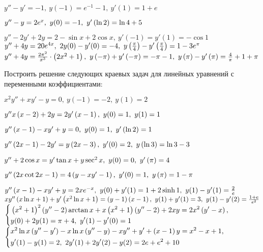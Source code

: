 	\begin{enumtasks}

		\label{bvp_bvp:constcoeffs_nonhmg}
		\item \( y'' - y' = -1, ~ y(-1) = e^{-1} - 1, ~ y'(1) = 1 + e \)		%
		\item \( y'' - y = 2 e^{x}, ~ y(0) = -1, ~ y' \left( \ln{2} \right) = \ln{4} + 5 \)		%
		\item \( y'' - 2 y' + 2 y = 2 - \sin{x} + 2 \cos{x}, ~ y'(-1) = y'(1) = - \cos{1} \)		%
		\itemstar \( y'' + 4 y = 20 e^{4 x}, ~ 2 y(0) - y'(0) = -4, ~ y \left( \frac{\pi}{4} \right) - y' \left( \frac{\pi}{4} \right) = 1 - 3 e^{\pi} \)		%
		\itemstar \( y'' + 4 y = \frac{2\pi^2}{x^3} \cdot \left( 2x^2 + 1 \right), ~ y \left( -\pi \right) + y' \left( -\pi \right) = - \pi - 1, ~ y \left( \pi \right) - y' \left( \pi \right) = \frac{4}{\pi} + 1 + \pi \)		%

	\end{enumtasks}

	Построить решение следующих краевых задач для линейных уравнений с переменными коэффициентами:
	\begin{enumtasks}

		\label{bvp_bvp:linear}
		\item \( x^2 y'' + xy' - y = 0, ~ y(-1) = -2, ~ y(1) = 2 \) %
		\item \( y'' x \left( x - 2 \right) + 2y = 2y' \left( x - 1 \right), ~ y(0) = 1, ~ y(1) = 1 \) %
		\item \( y'' \left( x - 1 \right) - xy' + y = 0, ~ y(0) = 1, ~ y' \left( \ln{2} \right) = 1 \) %
		\item \( y'' \left( 2x - 1 \right) - 2y' = y \left( 2x - 3 \right), ~ y'(0) = 2, ~ y \left( \ln{3} \right) = \ln{3} - 3 \) %
		\item \( y'' + 2 \cos{x} = y' \tan{x} + y \sec^2{x}, ~ y(0) = 0, ~ y'\left( \pi \right) = 4 \) %
		\item \( y'' \left( 2x \cot{2x} - 1 \right)= 4 \left( y - xy' - 1 \right), ~ y'(0) = 1, ~ y\left( \pi \right) = 1 - \pi \) %
		
		\label{bvp_bvp:linear_hard}
		\itemstar \( y'' \left( x - 1 \right) - xy' + y = 2xe^{-x}, ~ y(0) + y'(1) = 1 + 2 \sinh{1}, ~ y(1) - y'(1) = \frac{2}{e} \) %
		\itemstar \( x y'' \left( x \ln{x} + 1 \right) + y' \left( x^2 \ln{x} + 1 \right) = \left( y - 1 \right) \left( x - 1 \right), ~ y(1) + y'(1) = 3, ~ y(1) - y'(2) = \frac{1 + e}{e^2} \) %
		\itemstar \( \left\lbrace \begin{aligned} &\left( x^2 + 1 \right)^2 \left( y'' - 2 \right) \arctan{x} + x \left( x^2 + 1 \right) \left( y'' - 2 \right) + 2xy = 2x^2 \left( y' - x \right), \\ &y(0) + 2y(1) = \pi + 4, ~ y'(1) - y'(0) = 1 \end{aligned} \right. \) %
		\itemstar \( \left\lbrace \begin{aligned} &x^2 \ln{x} \left( y'' - y' \right) - x \ln{x} \left( y'' - y \right) - xy'' + y' + \left( x - 1 \right) y = x^2 - x + 1, \\ &y'(1) - y(1) = 2, ~ 2y'(1) + 2y'(2) - y(2) = 2e + e^2 + 10 \end{aligned} \right. \) %

	\end{enumtasks}

